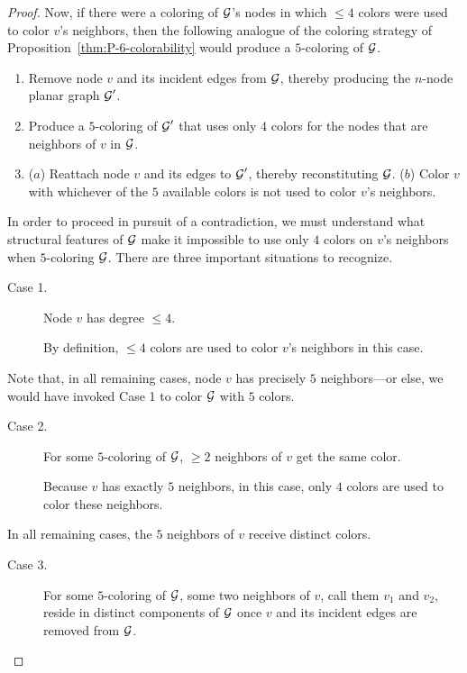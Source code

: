 {\begin{proof}
Now, if there were a coloring of $\mbox{$\cal G$}$'s nodes in which $\leq 4$ colors
were used to color $v$'s neighbors, then the following analogue of the
coloring strategy of Proposition~\ref{thm:P-6-colorability} would
produce a $5$-coloring of $\mbox{$\cal G$}$.
\begin{enumerate}
\item
Remove node $v$ and its incident edges from $\mbox{$\cal G$}$, thereby producing
the $n$-node planar graph $\mbox{$\cal G$}'$.
\item
Produce a $5$-coloring of $\mbox{$\cal G$}'$ that uses only $4$ colors for the
nodes that are neighbors of $v$ in $\mbox{$\cal G$}$.
\item
($a$) Reattach node $v$ and its edges to $\mbox{$\cal G$}'$, thereby reconstituting
  $\mbox{$\cal G$}$.  ($b$) Color $v$ with whichever of the $5$ available colors is
  not used to color $v$'s neighbors.
\end{enumerate}

In order to proceed in pursuit of a contradiction, we must understand
what structural features of $\mbox{$\cal G$}$ make it impossible to use only $4$
colors on $v$'s neighbors when $5$-coloring $\mbox{$\cal G$}$.  There are three
important situations to recognize.
\begin{description}
\item[{\sf Case 1}.]
Node $v$ has degree $\leq 4$.

\smallskip

By definition, $\leq 4$ colors are used to color $v$'s neighbors in
this case.
\end{description}
Note that, in all remaining cases, node $v$ has precisely $5$
neighbors---or else, we would have invoked Case 1 to color $\mbox{$\cal G$}$ with
$5$ colors.
\begin{description}
\item[{\sf Case 2}.]
For some $5$-coloring of $\mbox{$\cal G$}$, $\geq 2$ neighbors of $v$ get the same
color.

\smallskip

Because $v$ has exactly $5$ neighbors, in this case, only $4$ colors
are used to color these neighbors.
\end{description}
In all remaining cases, the $5$ neighbors of $v$ receive distinct
colors.
\begin{description}
\item[{\sf Case 3}.]
For some $5$-coloring of $\mbox{$\cal G$}$, some two neighbors of $v$, call them
$v_1$ and $v_2$, reside in distinct components of $\mbox{$\cal G$}$ once $v$ and
its incident edges are removed from $\mbox{$\cal G$}$.

\smallskip


\end{description}
\end{proof}}
